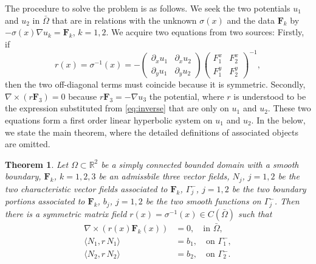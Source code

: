 \documentclass[a4paper,11pt]{article}
\def\F{\mathbf{F}}
\newtheorem{theorem}{Theorem}[section]
\begin{document}
The procedure to solve the problem is as follows. We seek the two potentials $u_1$ and $u_2$ in $\bar\Omega$ that are in relations with the unknown $\sigma(x)$ and the data $\F_k$ by $-\sigma(x)\nabla u_k = \F_k$, $k=1,2$. We acquire two equations from two sources: Firstly, if
\begin{equation}
r(x) = \sigma^{-1}(x) = -\begin{pmatrix} \partial_x u_1 & \partial_x u_2 \\ \partial_y u_1 & \partial_y u_2 \end{pmatrix}
\begin{pmatrix} F^x_1 & F^x_2 \\ F^y_1 & F^y_2 \end{pmatrix}^{-1}, \label{eq:inverse}
\end{equation}
then the two off-diagonal terms must coincide because it is symmetric. Secondly, $ \nabla\times (r\F_3) = 0$ because $r\F_3=-\nabla u_3$ the potential, where $r$ is understood to be the expression substituted from \eqref{eq:inverse} that are only on $u_1$ and $u_2$. These two equations form a first order linear hyperbolic system on $u_1$ and $u_2$. In the below, we state the main theorem, where the detailed definitions of associated objects are omitted.
\begin{theorem}
 Let $\Omega\subset \mathbb{R}^2$ be a simply connected bounded domain with a smooth boundary, $\F_k$, $k=1,2,3$ be an admissbile three vector fields, $N_j$, $j=1,2$ be the two characteristic vector fields associated to $\F_k$, $\Gamma_j^-$, $j=1,2$ be the two boundary portions associated to $\F_k$, $b_j$, $j=1,2$ be the two smooth functions on $\Gamma_j^-$. Then there is a symmetric matrix field $r(x)=\sigma^{-1}(x) \in C(\bar\Omega)$ such that
 \begin{align}
  \nabla \times (r(x)\F_k(x)) &=0, \quad \text{in $\bar\Omega$},\\
  \langle N_1, r\,N_1\rangle &=b_1, \quad \text{on $\Gamma_1^-$},\\
  \langle N_2, r\,N_2\rangle &=b_2, \quad \text{on $\Gamma_2^-$}.
 \end{align}
\end{theorem}
\end{document}
